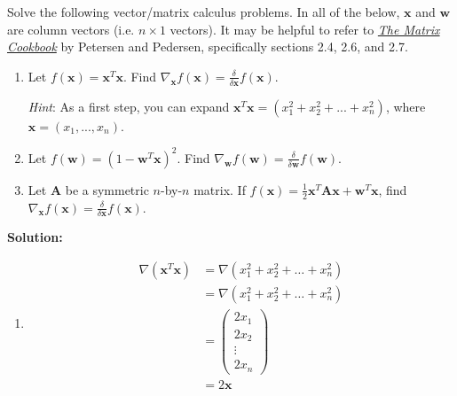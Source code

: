 \documentclass{harvardml}
\theoremstyle{definition}
\theoremstyle{plain}
\begin{document}
        
        

\begin{problem} 
		       Solve the following vector/matrix calculus problems. In all of the below, $\mathbf{x}$ and $\mathbf{w}$ are column vectors (i.e. $n \times 1$ vectors).  It may be helpful to refer to \href{https://www.math.uwaterloo.ca/~hwolkowi/matrixcookbook.pdf}{\emph{The Matrix Cookbook}} by Petersen and Pedersen, specifically sections 2.4, 2.6, and 2.7.
		    
		    \begin{enumerate} [label=(\alph*)]
		        \item Let $f(\mathbf{x}) = \mathbf{x}^T \mathbf{x}$. Find $\nabla_{\mathbf{x}} f(\mathbf{x}) = \frac{\delta}{\delta \mathbf{x}} f(\mathbf{x})$.
		        
		        \emph{Hint}: As a first step, you can expand $\mathbf{x}^T \mathbf{x} = (x_1^2 + x_2^2 + ... + x_n^2)$, where $\mathbf{x} = (x_1, ..., x_n)$. 
		        
		        \item Let $f(\mathbf{w}) = (1 - \mathbf{w}^T \mathbf{x})^2$. Find $\nabla_{\mathbf{w}} f(\mathbf{w}) = \frac{\delta}{\delta \mathbf{w}} f(\mathbf{w})$.
		        
		        \item Let $\mathbf{A}$ be a symmetric $n$-by-$n$ matrix. If $f(\mathbf{x}) = \frac{1}{2}\mathbf{x}^T \mathbf{A} \mathbf{x} + \mathbf{w}^T \mathbf{x}$, find $\nabla_{\mathbf{x}} f(\mathbf{x}) = \frac{\delta}{\delta \mathbf{x}} f(\mathbf{x})$.
		        \end{enumerate}
		    \textbf{Solution:}
		    
		    \begin{enumerate} [label=(\alph*)]
		        \item \begin{align*}
		            \nabla (\mathbf{x}^T\mathbf{x}) &= \nabla (x_{1}^2 + x_{2}^2 + \ldots + x_{n}^2) \\
		            &= \nabla (x_{1}^2 + x_{2}^2 + \ldots + x_{n}^2) \\
		            &= \begin{pmatrix} 2x_1 \\ 2x_2 \\ \vdots \\ 2x_n
		            \end{pmatrix} \\
		            &= 2\mathbf{x}
		        \end{align*}
		        

\end{enumerate}
\end{problem}
\end{document}

